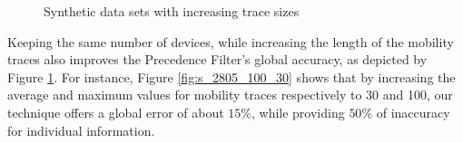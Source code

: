 \begin{figure}[htb]
\hspace*{-0.7em}
\hspace*{-0.7em}
\caption{Synthetic data sets with increasing trace sizes}
\label{fig:perf_results_sim_trace_size}
\end{figure}

Keeping the same number of devices, while increasing the length of the
mobility traces also improves the Precedence Filter's global accuracy, as
depicted by Figure \ref{fig:perf_results_sim_trace_size}. For instance,
Figure \ref{fig:s_2805_100_30} shows that by increasing the average
and maximum values for mobility traces respectively to 30 and 100, our
technique offers a global error of about $15\%$, while providing $50\%$
of inaccuracy for individual information.


